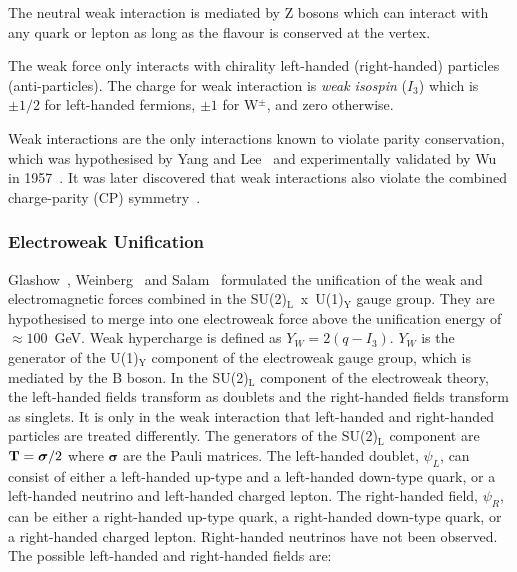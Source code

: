 The neutral weak interaction is mediated by Z bosons which can interact with any quark or lepton as long as the flavour is conserved at the vertex.

The weak force only interacts with chirality left-handed (right-handed) particles (anti-particles).
The charge for weak interaction is \emph{weak isospin} ($I_{3}$) which is $\pm1/2$ for left-handed fermions, $\pm1$ for W$^{\pm}$, and zero otherwise.

Weak interactions are the only interactions known to violate parity conservation, which was hypothesised by Yang and Lee~\cite{PhysRev.104.254} and experimentally validated by Wu in 1957~\cite{PhysRev.105.1413}. It was later discovered that weak interactions also violate the combined charge-parity (CP) symmetry~\cite{Cronin2012,PhysRevLett.13.138}.


\subsubsection{Electroweak Unification}

Glashow~\cite{Glashow:1961tr}, Weinberg~\cite{PhysRevLett.19.1264} and Salam~\cite{Salam:1968rm} formulated the unification of the weak and electromagnetic forces combined in the SU(2)$_{\textrm{L}}$~x~U(1)$_{\textrm{Y}}$ gauge group. They are hypothesised to merge into one electroweak force above the unification energy of $\approx 100$~GeV. Weak hypercharge is defined as $Y_{W} = 2(q-I_{3})$. $Y_W$ is the generator of the U(1)$_{\textrm{Y}}$ component of the electroweak gauge group, which is mediated by the B boson. In the SU(2)$_{\textrm{L}}$ component of the electroweak theory, the left-handed fields transform as doublets and the right-handed fields transform as singlets. It is only in the weak interaction that left-handed and right-handed particles are treated differently. The generators of the SU(2)$_{\textrm{L}}$ component are ${\bf T} = \boldsymbol{\sigma}/2$ where $\boldsymbol{\sigma}$ are the Pauli matrices.
The left-handed doublet, $\psi_L$, can consist of either a left-handed up-type and a left-handed down-type quark, or a left-handed neutrino and left-handed charged lepton. The right-handed field, $\psi_R$, can be either a right-handed up-type quark, a right-handed down-type quark, or a right-handed charged lepton. Right-handed neutrinos have not been observed. The possible left-handed and right-handed fields are:

